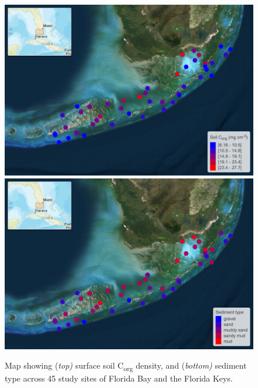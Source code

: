 \begin{figure}[h]
  \centering
  \includegraphics[width=.95\textwidth]{OEM_6_Carbon_map_A.png}   
  \includegraphics[width=.95\textwidth]{OEM_6_Carbon_map_B.png}
\caption[Map of sediment characteristics]{Map showing (\textit{top)} surface soil C\textsubscript{org} density, and (\textit{bottom)} sediment type across 45 study sites of Florida Bay and the Florida Keys.}
  \label{fig:2F3}
\end{figure}





